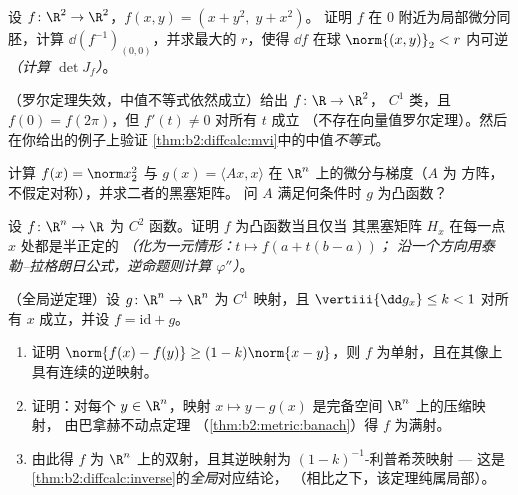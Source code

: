 \begin{exercise}[$\star\star\star$]\label{exo:b2:diffcalc:8}
设 $f \colon \R^2 \to \R^2$，$f(x, y) = (x + y^2,\; y + x^2)$。
证明 $f$ 在 $0$ 附近为局部微分同胚，计算
$\dd(f^{-1})_{(0,0)}$，并求最大的 $r$，使得 $\dd f$
在球 $\norm{(x,y)}_2 < r$ 内可逆\emph{（计算
$\det J_f$）}。
\end{exercise}

\begin{exercise}[$\star\star\star$]\label{exo:b2:diffcalc:9}
（罗尔定理失效，中值不等式依然成立）给出 $f \colon \R \to \R^2$，
$C^1$ 类，且 $f(0) = f(2\pi)$，但 $f'(t) \neq 0$ 对所有 $t$ 成立
（不存在向量值罗尔定理）。然后在你给出的例子上验证
\cref{thm:b2:diffcalc:mvi}中的中值\emph{不等式}。
\end{exercise}

\begin{exercise}[$\star$]\label{exo:b2:diffcalc:10}
计算 $f(x) = \norm
x_2^2$ 与 $g(x) = \langle Ax, x\rangle$ 在 $\R^n$ 上的微分与梯度（$A$ 为
方阵，不假定对称），并求二者的黑塞矩阵。
问 $A$ 满足何条件时 $g$ 为凸函数？
\end{exercise}

\begin{exercise}[$\star\star$]\label{exo:b2:diffcalc:11}
设 $f \colon \R^n \to \R$ 为 $C^2$ 函数。证明 $f$ 为凸函数当且仅当
其黑塞矩阵 $H_x$ 在每一点 $x$ 处都是半正定的
\emph{（化为一元情形：$t \mapsto f(a + t(b-a))$；
沿一个方向用泰勒–拉格朗日公式，逆命题则计算
$\varphi''$）}。
\end{exercise}

\begin{exercise}[$\star\star\star$]\label{exo:b2:diffcalc:12}
（全局逆定理）设 $g \colon \R^n \to \R^n$ 为 $C^1$ 映射，且
$\vertiii{\dd g_x} \leq k < 1$ 对所有 $x$ 成立，并设 $f =
\mathrm{id} + g$。
\begin{enumerate}
  \item 证明 $\norm{f(x) - f(y)} \geq (1 - k)\norm{x - y}$，则 $f$
        为单射，且在其像上具有连续的逆映射。
  \item 证明：对每个 $y \in \R^n$，映射 $x \mapsto y -
        g(x)$ 是完备空间 $\R^n$ 上的压缩映射，
        由巴拿赫不动点定理
        （\cref{thm:b2:metric:banach}）得 $f$ 为满射。
  \item 由此得 $f$ 为 $\R^n$ 上的双射，且其逆映射为
        $(1-k)^{-1}$-利普希茨映射 --- 这是
        \cref{thm:b2:diffcalc:inverse}的\emph{全局}对应结论，
        （相比之下，该定理纯属局部）。
\end{enumerate}
\end{exercise}


